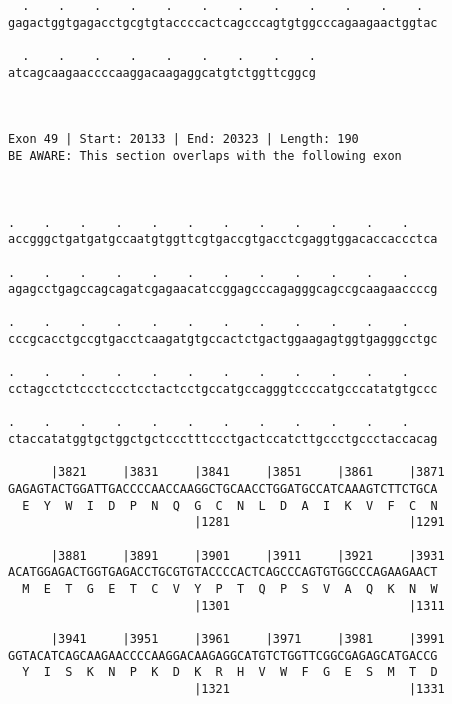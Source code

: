 \documentclass{article}
\begin{document}
\begin{Verbatim}
  .    .    .    .    .    .    .    .    .    .    .    .  
gagactggtgagacctgcgtgtaccccactcagcccagtgtggcccagaagaactggtac
                                                            
  .    .    .    .    .    .    .    .    .
atcagcaagaaccccaaggacaagaggcatgtctggttcggcg
                                           
                                           
 
Exon 49 | Start: 20133 | End: 20323 | Length: 190
BE AWARE: This section overlaps with the following exon



.    .    .    .    .    .    .    .    .    .    .    .    
accgggctgatgatgccaatgtggttcgtgaccgtgacctcgaggtggacaccaccctca
                                                            
.    .    .    .    .    .    .    .    .    .    .    .    
agagcctgagccagcagatcgagaacatccggagcccagagggcagccgcaagaaccccg
                                                            
.    .    .    .    .    .    .    .    .    .    .    .    
cccgcacctgccgtgacctcaagatgtgccactctgactggaagagtggtgagggcctgc
                                                            
.    .    .    .    .    .    .    .    .    .    .    .    
cctagcctctccctccctcctactcctgccatgccagggtccccatgcccatatgtgccc
                                                            
.    .    .    .    .    .    .    .    .    .    .    .    
ctaccatatggtgctggctgctccctttccctgactccatcttgccctgccctaccacag
                                                            
      |3821     |3831     |3841     |3851     |3861     |3871
GAGAGTACTGGATTGACCCCAACCAAGGCTGCAACCTGGATGCCATCAAAGTCTTCTGCA
  E  Y  W  I  D  P  N  Q  G  C  N  L  D  A  I  K  V  F  C  N
                          |1281                         |1291
  
      |3881     |3891     |3901     |3911     |3921     |3931
ACATGGAGACTGGTGAGACCTGCGTGTACCCCACTCAGCCCAGTGTGGCCCAGAAGAACT
  M  E  T  G  E  T  C  V  Y  P  T  Q  P  S  V  A  Q  K  N  W
                          |1301                         |1311
  
      |3941     |3951     |3961     |3971     |3981     |3991
GGTACATCAGCAAGAACCCCAAGGACAAGAGGCATGTCTGGTTCGGCGAGAGCATGACCG
  Y  I  S  K  N  P  K  D  K  R  H  V  W  F  G  E  S  M  T  D
                          |1321                         |1331
  

\end{Verbatim}
\end{document}
